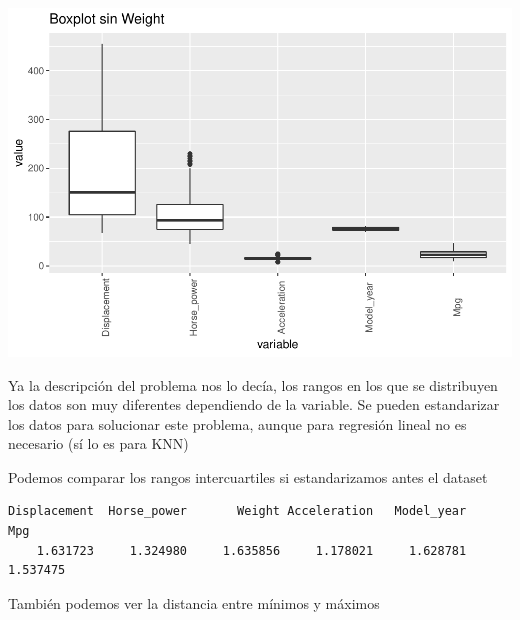 \documentclass[
]{article}
\newenvironment{Shaded}{\begin{snugshade}}{\end{snugshade}}
\newcommand{\DecValTok}[1]{\textcolor[rgb]{0.00,0.00,0.81}{#1}}
\newcommand{\KeywordTok}[1]{\textcolor[rgb]{0.13,0.29,0.53}{\textbf{#1}}}
\newcommand{\NormalTok}[1]{#1}
\newcommand{\OperatorTok}[1]{\textcolor[rgb]{0.81,0.36,0.00}{\textbf{#1}}}
\newcommand{\StringTok}[1]{\textcolor[rgb]{0.31,0.60,0.02}{#1}}
\begin{document}
\begin{center}\includegraphics{EDA_files/figure-latex/unnamed-chunk-9-2} \end{center}

Ya la descripción del problema nos lo decía, los rangos en los que se
distribuyen los datos son muy diferentes dependiendo de la variable. Se
pueden estandarizar los datos para solucionar este problema, aunque para
regresión lineal no es necesario (sí lo es para KNN)

Podemos comparar los rangos intercuartiles si estandarizamos antes el
dataset

\begin{Shaded}
\end{Shaded}

\begin{verbatim}
Displacement  Horse_power       Weight Acceleration   Model_year          Mpg 
    1.631723     1.324980     1.635856     1.178021     1.628781     1.537475 
\end{verbatim}

También podemos ver la distancia entre mínimos y máximos

\begin{Shaded}
\end{Shaded}
\end{document}
